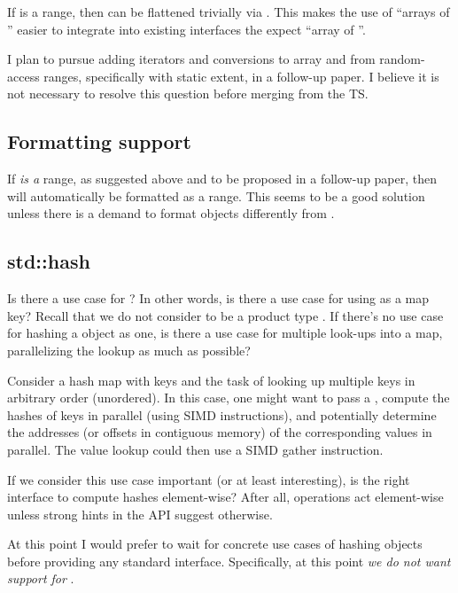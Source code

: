 If  is a range, then \std{} can
be flattened trivially via .
This makes the use of ``arrays of '' easier to integrate into
existing interfaces the expect ``array of ''.

I plan to pursue adding iterators and conversions to array and from
random-access ranges, specifically  with static extent, in a
follow-up paper.
I believe it is not necessary to resolve this question before merging
 from the TS.

\subsection{Formatting support}\label{sec:formatting}
If  \emph{is a} range, as suggested above and to be proposed in a
follow-up paper, then  will automatically be formatted as a range.
This seems to be a good solution unless there is a demand to format 
objects differently from .

\subsection{std::hash}\label{sec:hash}

Is there a use case for \std{}?
In other words, is there a use case for using  as a map key?
Recall that we do not consider  to be a product type \cite{P0851R0}.
If there's no use case for hashing a \simd object as one, is there a use case
for multiple look-ups into a map, parallelizing the lookup as much as possible?

Consider a hash map with  keys and the task of looking up multiple
keys in arbitrary order (unordered).
In this case, one might want to pass a , compute the hashes of
 keys in parallel (using SIMD instructions), and
potentially determine the addresses (or offsets in contiguous memory) of the
corresponding values in parallel.
The value lookup could then use a SIMD gather instruction.

If we consider this use case important (or at least interesting), is
\std{} the right interface to compute hashes element-wise?
After all,  operations act element-wise unless strong hints in the
API suggest otherwise.

At this point I would prefer to wait for concrete use cases of hashing \simd
objects before providing any standard interface.
Specifically, at this point \emph{we do not want \std{} support for
\simd}.

